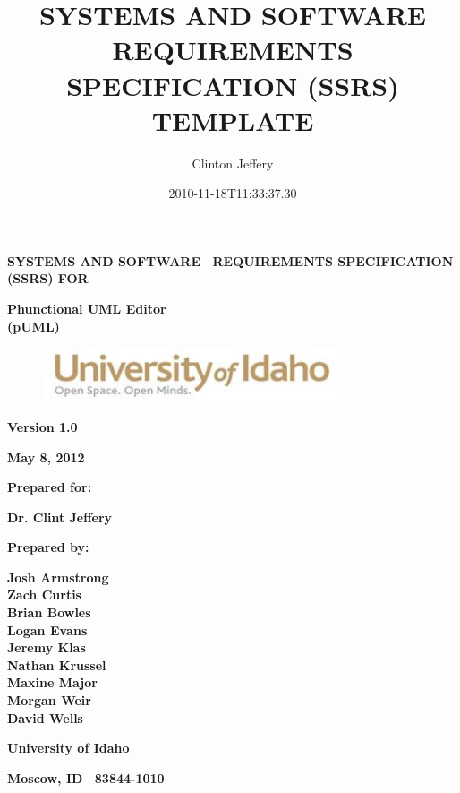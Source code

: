 \documentclass[twoside,letterpaper]{article}
\title{SYSTEMS AND SOFTWARE REQUIREMENTS SPECIFICATION (SSRS) TEMPLATE}
\author{Clinton Jeffery}
\date{2010-11-18T11:33:37.30}
\begin{document}
\clearpage
{\centering\bfseries
SYSTEMS AND SOFTWARE \ REQUIREMENTS SPECIFICATION (SSRS) FOR
\par}

\bigskip

{\centering\bfseries Phunctional UML Editor \\(pUML)
\par}


\bigskip


\bigskip


\bigskip

\begin{figure}
\centering
\includegraphics[width=3.5in]{uidahologo.jpg}
\end{figure}

\bigskip


\bigskip

{\centering\bfseries Version 1.0 
\par}

{\centering\bfseries May 8, 2012 
\par}


\bigskip


\bigskip

{\centering\bfseries Prepared for: 
\par}

{\centering\bfseries Dr. Clint Jeffery
\par}

\bigskip


\bigskip

{\centering\bfseries Prepared by:
\par}

{\centering\bfseries
Josh Armstrong
\\Zach Curtis
\\Brian Bowles
\\Logan Evans
\\Jeremy Klas
\\Nathan Krussel
\\Maxine Major
\\Morgan Weir
\\David Wells
\par}

{\centering\bfseries University of Idaho \par}

{\centering\bfseries Moscow, ID \ 83844-1010 \par}
\end{document}
